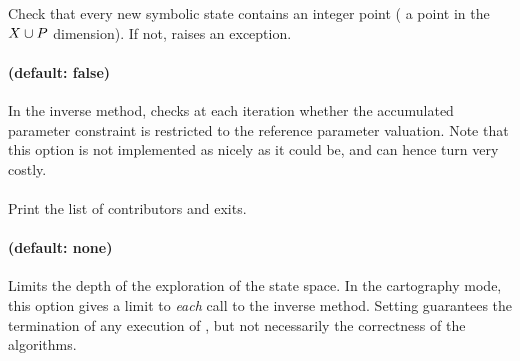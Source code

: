 Check that every new symbolic state contains an integer point (\ie{} a point in the $X \cup P$ dimension).
If not, raises an exception.


\paragraph{ (default: false)}

In the inverse method, checks at each iteration whether the accumulated parameter constraint is restricted to the reference parameter valuation.
Note that this option is not implemented as nicely as it could be, and can hence turn very costly.


% 


\paragraph{}
Print the list of contributors and exits.


\paragraph{ (default: none)}
Limits the depth of the exploration of the state space.
In the cartography mode, this option gives a limit to \emph{each} call to the inverse method.
Setting  guarantees the termination of any execution of \imitator{}, but not necessarily the correctness of the algorithms.


